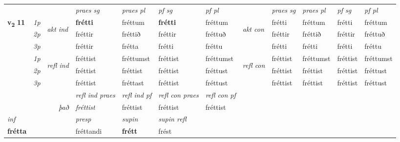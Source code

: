 \begin{longtable}[l]{X>{\footnotesize\itshape}llXXXXlXXXX}
\midrule

 & &   & \textit{praes sg}  & \textit{praes pl}    & \textit{ pf sg} & \textit{pf pl} & & \textit{praes sg}  & \textit{praes pl}    & \textit{pf sg} & \textit{pf pl }  \\ \cmidrule{4-7} \cmidrule{9-12}
 \multirow{2}{*}{{{\textbf{v{\textsubscript{2}}} \Large{\textbf{11}}}}}  & 1p & \multirow{3}{*}{\begin{turn}{90}\textit{akt ind}\end{turn}} & \textbf{frétti} & fréttum & \textbf{frétti} & fréttum & \multirow{3}{*}{\begin{turn}{90}\textit{akt con}\end{turn}} &frétti & fréttum & frétti & fréttum\\*
 & 2p &  &  fréttir  & fréttið & fréttir & fréttuð & & fréttir & fréttið & fréttir & fréttuð \\*
 & 3p &  & fréttir & frétta & frétti & fréttu & & frétti & frétti& frétti & fréttu \\*
\cmidrule{4-7} \cmidrule{9-12}
 & 1p & \multirow{3}{*}{\begin{turn}{90}\textit{refl ind}\end{turn}}  & fréttist & fréttumst & fréttist & fréttumst & \multirow{3}{*}{\begin{turn}{90}\textit{refl con}\end{turn}}  &fréttist & fréttumst & fréttist & fréttumst \\*
 & 2p &  & fréttist & fréttist & fréttist & fréttust & &fréttist & fréttist & fréttist & fréttust \\*
 & 3p  & & fréttist & fréttast & fréttist & fréttust & & fréttist & fréttist& fréttist & fréttust \\*
\cmidrule{4-7} \cmidrule{9-12}

 & && \textit{refl ind praes} & \textit{refl ind pf} & \textit{refl con praes} & \textit{refl con pf} \\*
\multicolumn{3}{r}{\textit{það}}& fréttist & fréttist & fréttist & fréttist \\*

\cmidrule{4-7}
   {\textit{inf}} & &     & \textit{presp} & \textit{supin} & \textit{supin refl}  \\*
  {\textbf{frétta}} & &     & fréttandi &  \textbf{frétt} & frést  \\*

\midrule


\end{longtable}
